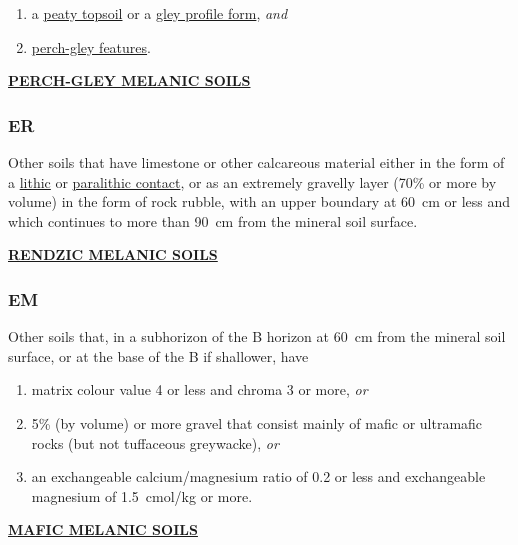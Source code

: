 \documentclass[
  letterpaper,
  DIV=11,
  numbers=noendperiod]{scrreprt}
\providecommand{\tightlist}{%
  \setlength{\itemsep}{0pt}\setlength{\parskip}{0pt}}\usepackage{longtable,booktabs,array}
\begin{document}
\begin{enumerate}
\def\labelenumi{\arabic{enumi}.}
\tightlist
\item
  a \protect\hyperlink{sec-diag-pts}{peaty topsoil} or a
  \protect\hyperlink{sec-diag-gleypf}{gley profile form}, \emph{and}
\item
  \protect\hyperlink{sec-diag-pgley}{perch-gley features}.
\end{enumerate}

\protect\hyperlink{sec-EP}{\textbf{PERCH-GLEY MELANIC SOILS}}

\hypertarget{sec-key-ER}{%
\subsubsection{\texorpdfstring{\textbf{ER}}{ER}}\label{sec-key-ER}}

Other soils that have limestone or other calcareous material either in
the form of a \protect\hyperlink{sec-diag-lithc}{lithic} or
\protect\hyperlink{sec-diag-plith}{paralithic contact}, or as an
extremely gravelly layer (70\% or more by volume) in the form of rock
rubble, with an upper boundary at 60~cm or less and which continues to
more than 90~cm from the mineral soil surface.

\protect\hyperlink{sec-ER}{\textbf{RENDZIC MELANIC SOILS}}

\hypertarget{sec-key-EM}{%
\subsubsection{\texorpdfstring{\textbf{EM}}{EM}}\label{sec-key-EM}}

Other soils that, in a subhorizon of the B horizon at 60~cm from the
mineral soil surface, or at the base of the B if shallower, have

\begin{enumerate}
\def\labelenumi{\arabic{enumi}.}
\tightlist
\item
  matrix colour value 4 or less and chroma 3 or more, \emph{or}
\item
  5\% (by volume) or more gravel that consist mainly of mafic or
  ultramafic rocks (but not tuffaceous greywacke), \emph{or}
\item
  an exchangeable calcium/magnesium ratio of 0.2 or less and
  exchangeable magnesium of 1.5~cmol/kg or more.
\end{enumerate}

\protect\hyperlink{sec-EM}{\textbf{MAFIC MELANIC SOILS}}
\end{document}
